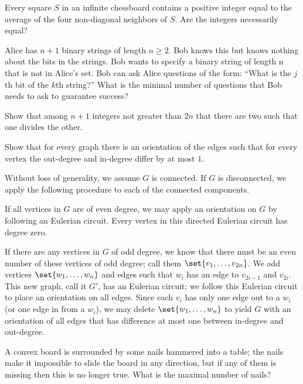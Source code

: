\documentclass[10pt]{mypackage}
\begin{document}
\RaggedRight
\begin{problem}[Problem 1]
  Every square $S$ in an infinite chessboard contains a positive integer equal to the average of the four non-diagonal neighbors of $S$. Are the integers necessarily equal?
\end{problem}
\begin{problem}[Problem 2]
  Alice has $n+1$ binary strings of length $n\geq 2$. Bob knows this but knows nothing about the bits in the strings. Bob wants to specify a binary string of length n that is not in Alice’s set. Bob can ask Alice questions of the form: ``What is the $j$th bit of the $k$th string?'' What is the minimal number of questions that Bob needs to ask to guarantee success?
\end{problem}
\begin{problem}[Problem 3]
  Show that among $n+1$ integers not greater than $2n$ that there are two such that one divides the other.
\end{problem}
\begin{problem}[Problem 4]
Show that for every graph there is an orientation of the edges such that for every vertex the out-degree and in-degree differ by at most $1$.
\end{problem}
\begin{solution}
  Without loss of generality, we assume $G$ is connected. If $G$ is disconnected, we apply the following procedure to each of the connected components.\newline

  If all vertices in $G$ are of even degree, we may apply an orientation on $G$ by following an Eulerian circuit. Every vertex in this directed Eulerian circuit has degree zero.\newline

  If there are any vertices in $G$ of odd degree, we know that there must be an even number of these vertices of odd degree; call them $\set{v_1,\dots,v_{2n}}$. We add vertices $\set{w_1,\dots,w_n}$ and edges such that $w_i$ has an edge to $v_{2i-1}$ and $v_{2i}$. This new graph, call it $G'$, has an Eulerian circuit; we follow this Eulerian circuit to place an orientation on all edges. Since each $v_i$ has only one edge out to a $w_i$ (or one edge in from a $w_i$), we may delete $\set{w_1,\dots,w_n}$ to yield $G$ with an orientation of all edges that has difference at most one between in-degree and out-degree.
\end{solution}

\begin{problem}[Problem 5]
  A convex board is surrounded by some nails hammered into a table; the nails make it impossible to slide the board in any direction, but if any of them is missing then this is no longer true. What is the maximal number of nails?
\end{problem}
\end{document}
